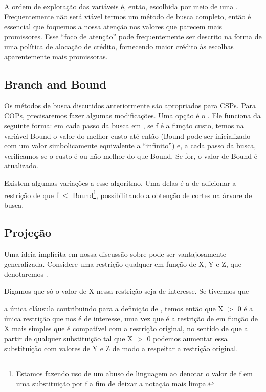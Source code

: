 \documentclass{article}
\begin{document}
A ordem de exploração das variáveis é, então, escolhida por meio de uma . Frequentemente não será viável termos um método de busca completo, então é essencial que foquemos a nossa atenção nos valores que parecem mais promissores. Esse ``foco de atenção'' pode frequentemente ser descrito na forma de uma política de alocação de crédito, fornecendo maior crédito às escolhas aparentemente mais promissoras.

\subsection{Branch and Bound}

Os métodos de busca discutidos anteriormente são apropriados para CSPs. Para COPs, precisaremos fazer algumas modificações. Uma opção é o . Ele funciona da seguinte forma: em cada passo da busca em , se f é a função custo, temos na variável Bound o valor do melhor custo até então (Bound pode ser inicializado com um valor simbolicamente equivalente a ``infinito'') e, a cada passo da busca, verificamos se o custo é ou não melhor do que Bound. Se for, o valor de Bound é atualizado.

Existem algumas variações a esse algoritmo. Uma delas é a de adicionar a restrição de que f $<$ Bound\footnote{Estamos fazendo uso de um abuso de linguagem ao denotar o valor de f em uma substituição por f a fim de deixar a notação mais limpa.}, possibilitando a obtenção de cortes na árvore de busca.

\subsection{Projeção}

Uma ideia implícita em nossa discussão sobre  pode ser vantajosamente generalizada. Considere uma restrição qualquer em função de X, Y e Z, que denotaremos .

Digamos que só o valor de X nessa restrição seja de interesse. Se tivermos que


 a única cláusula contribuindo para a definição de , temos então que X $>$ 0
é a única restrição que nos é de interesse, uma vez que é a restrição de em função de X mais simples que é compatível com a restrição original, no sentido de que a partir de qualquer substituição tal que X $>$ 0 podemos aumentar essa substituição com valores de Y e Z de modo a respeitar a restrição original.
\end{document}
